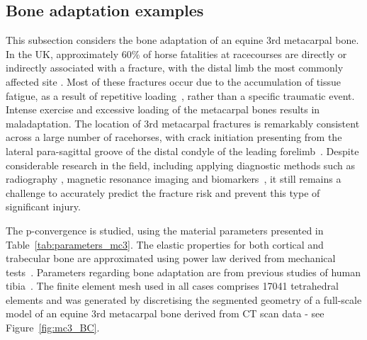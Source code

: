 \documentclass[twocolumn]{svjour3}
\begin{document}
\subsection{Bone adaptation examples}
\label{sec:numerical_examples:bone_adap}
This subsection considers the bone adaptation of an equine 3rd metacarpal bone. 
In the UK, approximately 60\% of horse fatalities at racecourses are directly or indirectly associated with a fracture, with the distal limb the most commonly affected site \cite{parkin2004risk}.
Most of these fractures occur due to the accumulation of tissue fatigue, as a result of repetitive loading~\cite{Parkin2005}, rather than a specific traumatic event. 
Intense exercise and excessive loading of the metacarpal bones results in maladaptation. 
The location of 3rd metacarpal fractures is remarkably consistent across a large number of racehorses,  with crack initiation presenting from 
the lateral para-sagittal groove of the distal condyle of the leading forelimb~\cite{jacklin2012frequency, parkin2006analysis}.
Despite considerable research in the field, including applying diagnostic methods such as radiography 
\cite{bogers2016quantitative, crijns2014intramodality, loughridge2017qualitative}, magnetic resonance imaging 
\cite{tranquille2017MRI} and biomarkers~\cite{mcilwraith2005use}, it still remains a challenge to accurately predict the fracture risk 
and prevent this type of significant injury.

The p-convergence is studied, using the material parameters presented in Table~\ref{tab:parameters_mc3}. The elastic properties for both cortical and trabecular bone are approximated using power law derived from mechanical tests~\cite{Les1994}. Parameters regarding bone adaptation are from previous studies of human tibia~\cite{pang2012computational,Waffenschmidt2012}. 
The finite element mesh used in all cases comprises 17041 tetrahedral elements and was generated by discretising the segmented geometry of a full-scale model of an equine 3rd metacarpal bone derived from CT scan data - see Figure~\ref{fig:mc3_BC}.
\end{document}
